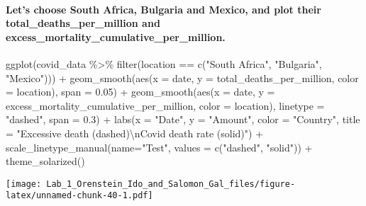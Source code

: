 \documentclass[
]{article}
\newenvironment{Shaded}{\begin{snugshade}}{\end{snugshade}}
\newcommand{\AttributeTok}[1]{\textcolor[rgb]{0.77,0.63,0.00}{#1}}
\newcommand{\FloatTok}[1]{\textcolor[rgb]{0.00,0.00,0.81}{#1}}
\newcommand{\FunctionTok}[1]{\textcolor[rgb]{0.00,0.00,0.00}{#1}}
\newcommand{\NormalTok}[1]{#1}
\newcommand{\SpecialCharTok}[1]{\textcolor[rgb]{0.00,0.00,0.00}{#1}}
\newcommand{\StringTok}[1]{\textcolor[rgb]{0.31,0.60,0.02}{#1}}
\begin{document}
\hypertarget{lets-choose-south-africa-bulgaria-and-mexico-and-plot-their-total_deaths_per_million-and-excess_mortality_cumulative_per_million.}{%
\paragraph{Let's choose South Africa, Bulgaria and Mexico, and plot
their total\_deaths\_per\_million and
excess\_mortality\_cumulative\_per\_million.}\label{lets-choose-south-africa-bulgaria-and-mexico-and-plot-their-total_deaths_per_million-and-excess_mortality_cumulative_per_million.}}

\begin{Shaded}
\begin{Highlighting}[]
\FunctionTok{ggplot}\NormalTok{(covid\_data }\SpecialCharTok{\%\textgreater{}\%} \FunctionTok{filter}\NormalTok{(location }\SpecialCharTok{==} \FunctionTok{c}\NormalTok{(}\StringTok{"South Africa"}\NormalTok{, }\StringTok{"Bulgaria"}\NormalTok{, }\StringTok{"Mexico"}\NormalTok{))) }\SpecialCharTok{+}
  \FunctionTok{geom\_smooth}\NormalTok{(}\FunctionTok{aes}\NormalTok{(}\AttributeTok{x =}\NormalTok{ date, }\AttributeTok{y =}\NormalTok{ total\_deaths\_per\_million, }\AttributeTok{color =}\NormalTok{ location), }\AttributeTok{span =} \FloatTok{0.05}\NormalTok{) }\SpecialCharTok{+}
  \FunctionTok{geom\_smooth}\NormalTok{(}\FunctionTok{aes}\NormalTok{(}\AttributeTok{x =}\NormalTok{ date, }\AttributeTok{y =}\NormalTok{ excess\_mortality\_cumulative\_per\_million, }\AttributeTok{color =}\NormalTok{ location), }\AttributeTok{linetype =} \StringTok{"dashed"}\NormalTok{, }\AttributeTok{span =} \FloatTok{0.3}\NormalTok{) }\SpecialCharTok{+}
  \FunctionTok{labs}\NormalTok{(}\AttributeTok{x =} \StringTok{"Date"}\NormalTok{, }\AttributeTok{y =} \StringTok{"Amount"}\NormalTok{, }\AttributeTok{color =} \StringTok{"Country"}\NormalTok{, }\AttributeTok{title =} \StringTok{"Excessive death (dashed)}\SpecialCharTok{\textbackslash{}n}\StringTok{Covid death rate (solid)"}\NormalTok{) }\SpecialCharTok{+} 
  \FunctionTok{scale\_linetype\_manual}\NormalTok{(}\AttributeTok{name=}\StringTok{"Test"}\NormalTok{, }\AttributeTok{values =} \FunctionTok{c}\NormalTok{(}\StringTok{"dashed"}\NormalTok{, }\StringTok{"solid"}\NormalTok{)) }\SpecialCharTok{+}
  \FunctionTok{theme\_solarized}\NormalTok{()}
\end{Highlighting}
\end{Shaded}

\texttt{[image: Lab\_1\_Orenstein\_Ido\_and\_Salomon\_Gal\_files/figure-latex/unnamed-chunk-40-1.pdf]}
\end{document}

